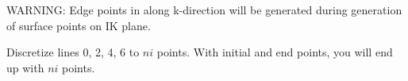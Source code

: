 \documentclass{article}
\begin{document}
WARNING: Edge points in along k-direction will be generated during generation of surface points on IK plane.

%
%
%

Discretize lines 0, 2, 4, 6 to $ni$ points. With initial and end points, you will end up with $ni$ points.
\end{document}
